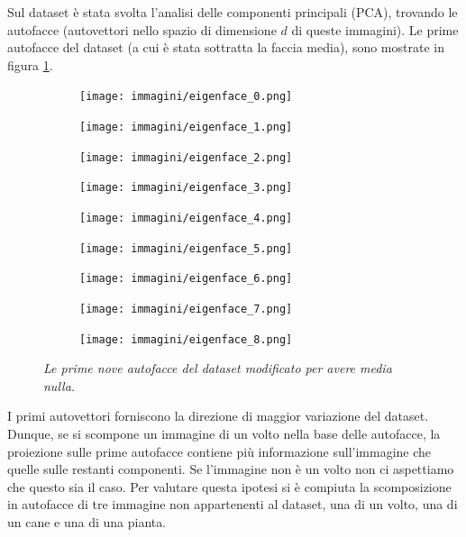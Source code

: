 \documentclass{article}
\begin{document}
Sul dataset è stata svolta l'analisi delle componenti principali (PCA), trovando le autofacce (autovettori nello spazio di dimensione $d$ di queste immagini).
Le prime autofacce del dataset (a cui è stata sottratta la faccia media), sono mostrate in figura \ref{fig:eigenfaces}.
\begin{figure}[H]
    \centering
    \begin{subfigure}[b]{0.29\textwidth}
        \centering
        \texttt{[image: immagini/eigenface\_0.png]}
    \end{subfigure}
    \begin{subfigure}[b]{0.29\textwidth}
        \centering
        \texttt{[image: immagini/eigenface\_1.png]}
    \end{subfigure}
    \begin{subfigure}[b]{0.29\textwidth}
        \centering
        \texttt{[image: immagini/eigenface\_2.png]}
    \end{subfigure}
    \begin{subfigure}[b]{0.29\textwidth}
        \centering
        \texttt{[image: immagini/eigenface\_3.png]}
    \end{subfigure}
    \begin{subfigure}[b]{0.29\textwidth}
        \centering
        \texttt{[image: immagini/eigenface\_4.png]}
    \end{subfigure}
    \begin{subfigure}[b]{0.29\textwidth}
        \centering
        \texttt{[image: immagini/eigenface\_5.png]}
    \end{subfigure}
    \begin{subfigure}[b]{0.29\textwidth}
        \centering
        \texttt{[image: immagini/eigenface\_6.png]}
    \end{subfigure}
    \begin{subfigure}[b]{0.29\textwidth}
        \centering
        \texttt{[image: immagini/eigenface\_7.png]}
    \end{subfigure}
    \begin{subfigure}[b]{0.29\textwidth}
        \centering
        \texttt{[image: immagini/eigenface\_8.png]}
    \end{subfigure}
    \caption{\emph{Le prime nove autofacce del dataset modificato per avere media nulla.}}
    \label{fig:eigenfaces}
\end{figure}

I primi autovettori forniscono la direzione di maggior variazione del dataset. Dunque, se si scompone un immagine di un volto nella base delle autofacce, la proiezione sulle prime autofacce contiene più informazione sull'immagine che quelle sulle restanti componenti.
Se l'immagine non è un volto non ci aspettiamo che questo sia il caso. Per valutare questa ipotesi si è compiuta la scomposizione in autofacce di tre immagine non appartenenti al dataset, una di un volto, una di un cane e una di una pianta.
\end{document}
